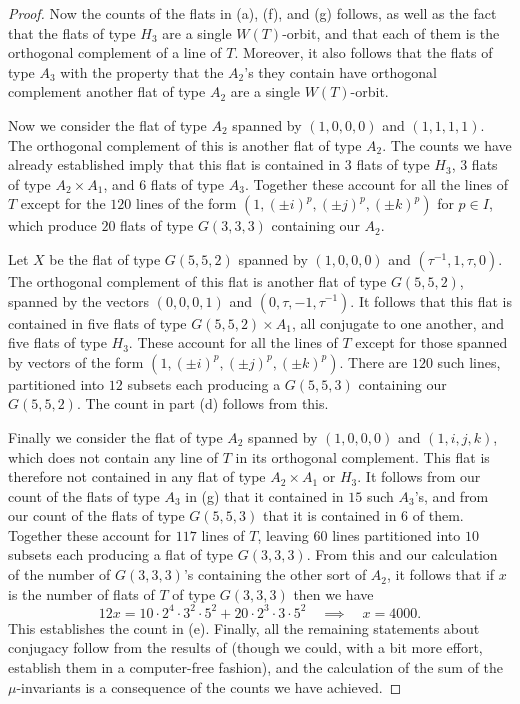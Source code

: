 \documentclass[11pt, reqno]{amsart}
\numberwithin{equation}{section}
\theoremstyle{definition}
\theoremstyle{plain}
\begin{document}
\begin{proof}
Now the counts of the flats in (a), (f), and (g) follows, as well as the fact that the flats of type $H_3$ are a single $W(T)$-orbit, and that each of them is the orthogonal complement of a line of $T$. Moreover, it also follows that the flats of type $A_3$ with the property that the $A_2$'s they contain have orthogonal complement another flat of type $A_2$ are a single $W(T)$-orbit.

Now we consider the flat of type $A_2$ spanned by $(1,0,0,0)$ and $(1,1,1,1)$. The orthogonal complement of this is another flat of type $A_2$. The counts we have already established imply that this flat is contained in $3$ flats of type $H_3$, $3$ flats of type $A_2 \times A_1$, and $6$ flats of type $A_3$. Together these account for all the lines of $T$ except for the $120$ lines of the form $(1,(\pm i)^p,(\pm j)^p, (\pm k)^p)$ for $p \in I$, which produce $20$ flats of type $G(3,3,3)$ containing our $A_2$. 

Let $X$ be the flat of type $G(5,5,2)$ spanned by $(1,0,0,0)$ and $(\tau^{-1},1,\tau,0)$. The orthogonal complement of this flat is another flat of type $G(5,5,2)$, spanned by the vectors $(0,0,0,1)$ and $(0,\tau,-1,\tau^{-1})$. It follows that this flat is contained in five flats of type $G(5,5,2) \times A_1$, all conjugate to one another, and five flats of type $H_3$. These account for all the lines of $T$ except for those spanned by vectors of the form $(1,(\pm i)^p,(\pm j)^p,(\pm k)^p)$. There are $120$ such lines, partitioned into $12$ subsets each producing a $G(5,5,3)$ containing our $G(5,5,2)$. The count in part (d) follows from this.

Finally we consider the flat of type $A_2$ spanned by $(1,0,0,0)$ and $(1,i,j,k)$, which does not contain any line of $T$ in its orthogonal complement. This flat is therefore not contained in any flat of type $A_2 \times A_1$ or $H_3$. It follows from our count of the flats of type $A_3$ in (g) that it contained in $15$ such $A_3$'s, and from our count of the flats of type $G(5,5,3)$ that it is contained in $6$ of them. Together these account for $117$ lines of $T$, leaving $60$ lines partitioned into $10$ subsets each producing a flat of type $G(3,3,3)$. From this and our calculation of the number of $G(3,3,3)$'s containing the other sort of $A_2$, it follows that if $x$ is the number of flats of $T$ of type $G(3,3,3)$ then we have
$$12x=10 \cdot 2^4 \cdot 3^2 \cdot 5^2+20 \cdot 2^3 \cdot 3 \cdot 5^2 \quad \implies \quad x=4000.$$ This establishes the count in (e). Finally, all the remaining statements about conjugacy follow from the results of \cite{BST} (though we could, with a bit more effort, establish them in a computer-free fashion), and the calculation of the sum of the $\mu$-invariants is a consequence of the counts we have achieved.

\end{proof}
\end{document}

